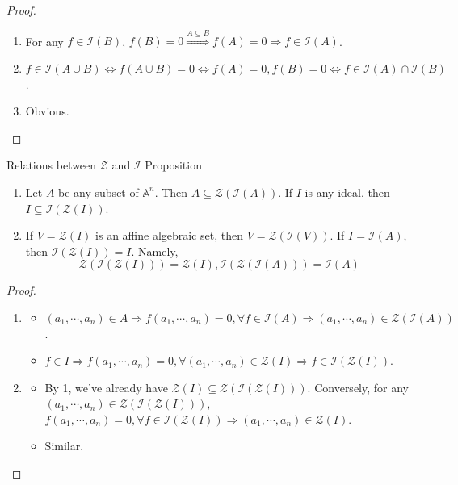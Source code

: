 \begin{proof}
    \begin{enumerate}
        \item For any $f \in \mathcal{I}(B)$, $f(B)=0 \overset{A \subseteq B}{\Rightarrow} f(A) =0 \Rightarrow f\in \mathcal{I}(A)$.
        \item $f\in \mathcal{I} (A\cup B) \Leftrightarrow f(A \cup B) =0 \Leftrightarrow f(A) =0,f(B)=0 \Leftrightarrow f\in \mathcal{I}(A) \cap \mathcal{I}(B)$.

        \item Obvious.
    \end{enumerate}
\end{proof}

\begin{proposition}{Relations between $\mathcal{Z}$ and $\mathcal{I}$ Proposition}
\begin{enumerate}
    \item Let $A$ be any subset of $\mathbb{A}^n$. Then $A \subseteq \mathcal{Z} (\mathcal{I} (A))$. If $I$ is any ideal, then $I \subseteq \mathcal{I} (\mathcal{Z} (I))$.
    \item If $V= \mathcal{Z}(I)$ is an affine algebraic set, then $V=\mathcal{Z} (\mathcal{I} (V))$. If $I= \mathcal{I}(A)$, then $\mathcal{I} (\mathcal{Z} (I))=I$. Namely,
    $$\mathcal{Z} (\mathcal{I} (\mathcal{Z}(I))) =\mathcal{Z}(I) , \mathcal{I} (\mathcal{Z} (\mathcal{I} (A))) =\mathcal{I}(A)$$
\end{enumerate}
\end{proposition}

\begin{proof}
    \begin{enumerate}
        \item \begin{itemize}
            \item $(a_1 ,\cdots, a_n)\in A \Rightarrow f(a_1 ,\cdots, a_n)=0, \forall f\in \mathcal{I}(A) \Rightarrow (a_1 ,\cdots, a_n) \in \mathcal{Z}(\mathcal{I}(A))$.

            \item $f\in I \Rightarrow f(a_1 ,\cdots, a_n)=0, \forall (a_1 ,\cdots, a_n) \in \mathcal{Z}(I) \Rightarrow f\in \mathcal{I}(\mathcal{Z}(I))$.
        \end{itemize}

        \item \begin{itemize}
            \item By 1, we've already have $\mathcal{Z}(I) \subseteq \mathcal{Z} (\mathcal{I} (\mathcal{Z}(I)))$. Conversely, for any $(a_1, \cdots, a_n) \in \mathcal{Z} (\mathcal{I} (\mathcal{Z} (I)))$, $f(a_1 ,\cdots, a_n)=0 ,\forall f\in \mathcal{I} (\mathcal{Z} (I)) \Rightarrow (a_1 ,\cdots, a_n) \in \mathcal{Z} (I)$.
            \item Similar.
        \end{itemize}
    \end{enumerate}
\end{proof}

